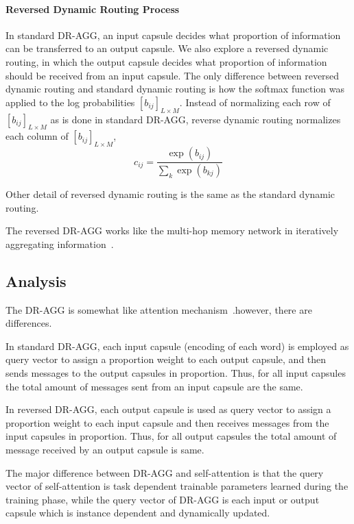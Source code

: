 \documentclass[11pt]{article}
\begin{document}
\paragraph{Reversed Dynamic Routing Process}

In standard DR-AGG, an input capsule decides what proportion of information can be transferred to an output capsule. We also explore a reversed dynamic routing, in which the output capsule decides what proportion of information should be received from an input capsule. The only difference between reversed dynamic routing and standard dynamic routing is how the softmax function was applied to the log probabilities $[b_{ij}]_{L\times M}$. Instead of normalizing each row of $[b_{ij}]_{L\times M}$ as is done in standard DR-AGG, reverse dynamic routing normalizes each column of $[b_{ij}]_{L\times M}$,
\begin{equation}
	\label{eq:Rrout_soft}
	c_{ij} = \frac{\exp(b_{ij})}{\sum_k{\exp(b_{kj})}}
\end{equation}

Other detail of reversed dynamic routing is the same as the standard dynamic routing.

The reversed DR-AGG works like the multi-hop memory network in iteratively aggregating information~\cite{sukhbaatar2015end,kumar2015ask}. 

\subsection{Analysis}

The DR-AGG is somewhat like attention mechanism~\cite{bahdanau2014neural,DBLP:conf/nips/VaswaniSPUJGKP17}.however, there are differences.

In standard DR-AGG, each input capsule (encoding of each word) is employed as query vector to assign a proportion weight to each output capsule, and then sends messages to the output capsules in proportion. Thus, for all input capsules the total amount of messages sent from an input capsule are the same.


In reversed DR-AGG, each output capsule is used as query vector to assign a proportion weight to each input capsule and then receives messages from the input capsules in proportion. Thus, for all output capsules the total amount of message received by an output capsule is same.

The major difference between DR-AGG and self-attention \cite{lin2017structured,yang2016hierarchical} is that the query vector of self-attention is task dependent trainable parameters learned during the training phase, while the query vector of DR-AGG is each input or output capsule which is instance dependent and dynamically updated.
\end{document}
